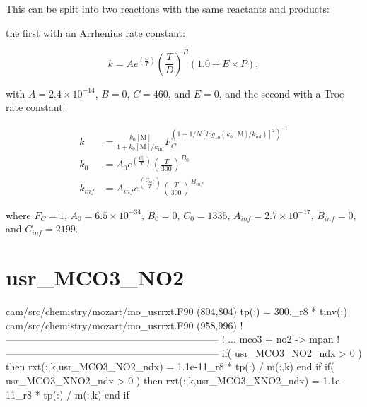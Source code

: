 \documentclass[titlepage]{article}
\begin{document}
This can be split into two reactions with the same reactants and products:
\vspace{20px}


\vspace{20px}
\noindent the first with an Arrhenius rate constant:

\begin{equation}
k = Ae^{(\frac{C}{T})}(\frac{T}{D})^B(1.0+E \times P),
\end{equation}

\noindent with $A = 2.4 \times 10^{-14}$, $B = 0$, $C = 460$, and $E = 0$, and the second
with a Troe rate constant:

\begin{equation}
\begin{split}
k & = \frac{k_0[\mbox{M}]}{1+k_0[\mbox{M}]/k_{\inf}}F_C^{(1+1/N[log_{10}(k_0[\mbox{M}]/k_{\inf})]^2)^{-1}} \\
k_0 & = A_0 e^{\left( \frac{C_0}{T} \right)} \left( \frac{T}{300} \right)^{B_0} \\
k_{inf} & = A_{inf} e^{\left( \frac{C_{inf}}{T} \right)} \left( \frac{T}{300} \right)^{B_{inf}}
\end{split}
\end{equation}

\noindent where $F_C = 1$, $A_0 = 6.5 \times 10^{-34}$, $B_0 = 0$, $C_0 = 1335$, $A_{inf} = 2.7 \times 10^{-17}$, $B_{inf} = 0$, and $C_{inf} = 2199$.



\section{usr\_MCO3\_NO2}

\begin{blockcode}[commandchars=\\\{\}]
\color{gray}cam/src/chemistry/mozart/mo_usrrxt.F90 (804,804)
       tp(:)             = 300._r8 * tinv(:)
\color{gray}cam/src/chemistry/mozart/mo_usrrxt.F90 (958,996)
!-----------------------------------------------------------------
!     ... mco3 + no2 -> mpan
!-----------------------------------------------------------------
       if( usr_MCO3_NO2_ndx > 0 ) then
          rxt(:,k,usr_MCO3_NO2_ndx) = 1.1e-11_r8 * tp(:) / m(:,k)
       end if
       if( usr_MCO3_XNO2_ndx > 0 ) then
          rxt(:,k,usr_MCO3_XNO2_ndx) = 1.1e-11_r8 * tp(:) / m(:,k)
       end if
\end{blockcode}
\end{document}
